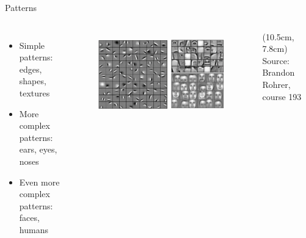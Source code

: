 \documentclass[citestyle=authoryear,bibstyle=numeric,hyperref,backend=biber]{sdqbeamer}
\begin{document}
\begin{frame}{Patterns}
\begin{columns}
    \begin{itemize}
       \item Simple patterns: edges, shapes, textures
       \item More complex patterns: ears, eyes, noses
       \item Even more complex patterns: faces, humans
    \end{itemize}

    \begin{figure}
        \centering
        \includegraphics[width=1\textwidth]{pictures/cnn18.png}
        \label{fig:enter-label}
    \end{figure}
    \begin{textblock*}{6cm}(10.5cm, 7.8cm) %
        \tiny{Source: Brandon Rohrer, course 193}
    \end{textblock*}
\end{columns}
\end{frame}
\end{document}
